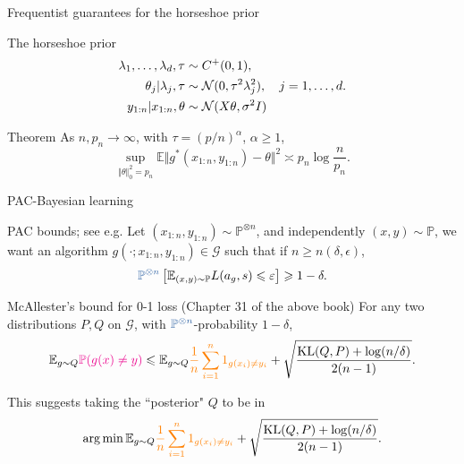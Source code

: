 \documentclass[10pt]{beamer}
\begin{document}
\begin{frame}{Frequentist guarantees for the horseshoe prior}
  \begin{block}{The horseshoe prior \citep{CaPoSc10}}
    \vspace{-15pt}
    \begin{align*}
      \lambda_1, \dots, \lambda_d, \tau & \sim C^+(0,1), \\
      \theta_j\vert \lambda_j, \tau &\sim \mathcal{N}(0, \tau^2 \lambda_j^2), \quad j=1,\dots, d.\\
      y_{1:n} \vert x_{1:n}, \theta &\sim \mathcal{N}(X\theta, \sigma^2 I)
    \end{align*}
  \end{block}
  \vfill
  \begin{block}{Theorem \citep{PaKlVa14}}
    As $n, p_n\rightarrow\infty$, with $\tau = (p/n)^\alpha$, $\alpha\geq 1$, 
    $$
    \sup_{\Vert\theta\Vert^2_0 = p_n} \mathbb E\Vert g^*(x_{1:n},y_{1:n})-\theta\Vert^2 \asymp p_n \log\frac{n}{p_n}.
    $$
  \end{block}
  

\end{frame}

\begin{frame}{PAC-Bayesian learning}
\begin{block}{PAC bounds; see e.g. \citep{ShBe14}}
Let $(x_{1:n},y_{1:n})\sim \mathbb{P}^{\otimes n}$, and independently $(x,y)\sim \mathbb{P}$, we want an algorithm $g(\cdot; x_{1:n}, y_{1:n})\in\mathcal G$ such that if $n\geq n(\delta,\epsilon)$,
$$
\unn{\mathbb{P}^{\otimes n}}\left[\mathbb{E}_{(x,y)\sim \mathbb P} L(a_g,s) \leq \epsilon\right] \geq 1-\delta.
$$
\end{block}
\begin{block}{McAllester's bound for 0-1 loss (Chapter 31 of the above book)}
For any two distributions $P,Q$ on $\mathcal G$, with $\unn{\mathbb{P}^{\otimes n}}$-probability $1-\delta$,
$$
\mathbb E_{g\sim Q} \textcolor{magenta}{\mathbb{P} (g(x)\neq y)} \leqslant \mathbb{E}_{g\sim Q} \textcolor{orange}{\frac1n\sum_{i=1}^n 1_{g(x_i)\neq y_i}} + \sqrt{\frac{\text{KL}(Q,P) + \log(n/\delta)}{2(n-1)}}.
$$
\end{block}

This suggests taking the ``posterior" $Q$ to be in
$$
\operatorname*{arg\,min} \mathbb{E}_{g\sim Q} \textcolor{orange}{\frac1n\sum_{i=1}^n 1_{g(x_i)\neq y_i}} + \sqrt{\frac{\text{KL}(Q,P) + \log(n/\delta)}{2(n-1)}}.
$$
\end{frame}
\end{document}
